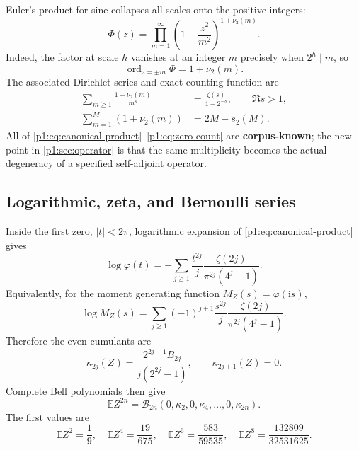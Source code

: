 \documentclass[11pt,oneside]{article}
\theoremstyle{definition}
\newcommand{\ii}{\mathrm i}
\newcommand{\E}{\mathbb E}
\newcommand{\ord}{\operatorname{ord}}
\newcommand{\vtwo}{\nu_2}
\newcommand{\wt}{s_2}
\newcommand{\PhiF}{\Phi}
\newcommand{\phiF}{\varphi}
\newcommand{\Bell}{\mathcal B}
\newcommand{\CorpusKnown}{\textcolor{linkblue}{\textbf{corpus-known}}}
\begin{document}
Euler's product for sine collapses all scales onto the positive integers:
\begin{equation}
 \boxed{\quad
 \PhiF(z)=\prod_{m=1}^{\infty}
 \left(1-\frac{z^2}{m^2}\right)^{1+\vtwo(m)}.
 \quad}
 \label{p1:eq:canonical-product}
\end{equation}
Indeed, the factor at scale \(h\) vanishes at an integer \(m\) precisely when
\(2^h\mid m\), so
\begin{equation}
 \ord_{z=\pm m}\PhiF=1+\vtwo(m).
 \label{p1:eq:zero-multiplicity}
\end{equation}
The associated Dirichlet series and exact counting function are
\begin{align}
 \sum_{m\ge1}\frac{1+\vtwo(m)}{m^s}
 &=\frac{\zeta(s)}{1-2^{-s}},\qquad \Re s>1,
 \label{p1:eq:zero-zeta}\\
 \sum_{m=1}^{M}(1+\vtwo(m))
 &=2M-\wt(M).
 \label{p1:eq:zero-count}
\end{align}
All of \eqref{p1:eq:canonical-product}--\eqref{p1:eq:zero-count} are \CorpusKnown{}; the
new point in \cref{p1:sec:operator} is that the same multiplicity becomes the actual
degeneracy of a specified self-adjoint operator.

\subsection{Logarithmic, zeta, and Bernoulli series}

Inside the first zero, \(|t|<2\pi\), logarithmic expansion of
\eqref{p1:eq:canonical-product} gives
\begin{equation}
 \log\phiF(t)
 =-\sum_{j\ge1}\frac{t^{2j}}{j}
 \frac{\zeta(2j)}{\pi^{2j}(4^j-1)}.
 \label{p1:eq:log-trace-series-preview}
\end{equation}
Equivalently, for the moment generating function \(M_Z(s)=\phiF(\ii s)\),
\begin{equation}
 \log M_Z(s)=\sum_{j\ge1}(-1)^{j+1}\frac{s^{2j}}{j}
 \frac{\zeta(2j)}{\pi^{2j}(4^j-1)}.
 \label{p1:eq:mgf-log-series}
\end{equation}
Therefore the even cumulants are
\begin{equation}
 \kappa_{2j}(Z)
 =\frac{2^{2j-1}B_{2j}}{j(2^{2j}-1)},
 \qquad \kappa_{2j+1}(Z)=0.
 \label{p1:eq:cumulants}
\end{equation}
Complete Bell polynomials then give
\begin{equation}
 \E Z^{2n}=\Bell_{2n}(0,\kappa_2,0,\kappa_4,\ldots,0,\kappa_{2n}).
 \label{p1:eq:bell-moments}
\end{equation}
The first values are
\begin{equation}
 \E Z^2=\frac19,\quad
 \E Z^4=\frac{19}{675},\quad
 \E Z^6=\frac{583}{59535},\quad
 \E Z^8=\frac{132809}{32531625}.
 \label{p1:eq:first-moments}
\end{equation}
\end{document}
